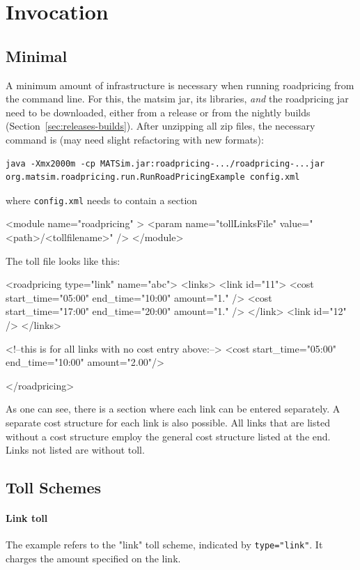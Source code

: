 \section{Invocation}
\subsection{Minimal}
A minimum amount of infrastructure is necessary when running roadpricing from the command line. For this, the \gls{matsim} \gls{jar}, its libraries, \emph{and} the roadpricing \gls{jar} need to be downloaded, either from a release or from the nightly builds (Section~\ref{sec:releases-builds}). After unzipping all zip files, the necessary command is (may need slight refactoring with new formats):
\begin{lstlisting}
java -Xmx2000m -cp MATSim.jar:roadpricing-.../roadpricing-...jar org.matsim.roadpricing.run.RunRoadPricingExample config.xml  
\end{lstlisting}
where \lstinline$config.xml$ needs to contain a section
\begin{xml}
	<module name="roadpricing" >
		<param name="tollLinksFile" value="<path>/<tollfilename>" />
	</module>
\end{xml}
The toll file looks like this:
%
\begin{xml}
<roadpricing type="link" name="abc">
   <links>
      <link id="11">
         <cost start_time="05:00" end_time="10:00" amount="1." />
         <cost start_time="17:00" end_time="20:00" amount="1." />
      </link>             
      <link id="12" />
   </links>

   <!--this is for all links with no cost entry above:-->
   <cost start_time="05:00" end_time="10:00" amount="2.00"/>

</roadpricing>
\end{xml}
%
As one can see, there is a section where each link can be entered separately. A separate cost structure for each link is also possible. All links that are listed without a cost structure employ the general cost structure listed at the end. Links not listed are without toll.

\subsection{Toll Schemes}
\paragraph{Link toll} The example refers to the "link" toll scheme, indicated by \lstinline$type="link"$. It charges the amount specified on the link.

